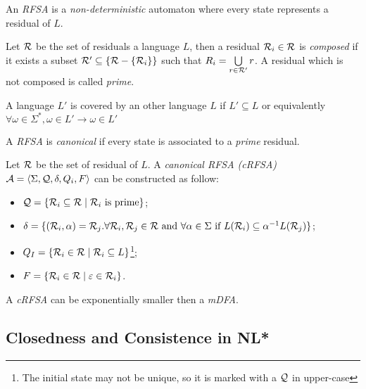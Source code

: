 \begin{definition}
  An \textit{RFSA} is a \textit{non-deterministic} automaton where every state represents a residual of $L$.
\end{definition}

\begin{definition}
  Let $\mathcal{R}$ be the set of residuals a language $L$, then a residual $\mathcal{R}_i \in \mathcal{R}$ is \textit{composed} if it exists a subset $\mathcal{R}' \subseteq \{\mathcal{R} - \{\mathcal{R}_i\}\}$ such that $R_i = \bigcup\limits_{r \in \mathcal{R}'}r$. A residual which is not composed is called \textit{prime}.
\end{definition}

\begin{definition}
  A language $L'$ is covered by an other language $L$ if $L' \subseteq L$ or equivalently $\forall \omega \in \Sigma^*, \omega \in L' \rightarrow \omega \in L'$
\end{definition}

\begin{definition}
  A \textit{RFSA} is \textit{canonical} if every state is associated to a \textit{prime} residual.
\end{definition}

Let $\mathcal{R}$ be the set of residual of $L$. A \textit{canonical RFSA (cRFSA)} $\mathcal{A} = \langle \Sigma, \mathcal{Q}, \delta, Q_i, F \rangle$ can be constructed as follow:
\begin{itemize}
  \item $\mathcal{Q} = \{\mathcal{R}_i \subseteq  \mathcal{R} \mid \mathcal{R}_i \text{ is prime}\}$;
  \item $\delta = \{(\mathcal{R}_i, \alpha) = \mathcal{R}_j. \forall \mathcal{R}_i, \mathcal{R}_j \in \mathcal{R} \text{ and } \forall \alpha \in \Sigma \text{ if } L(\mathcal{R}_i) \subseteq \alpha^{-1}L(\mathcal{R}_j)\}$;
  \item $Q_I = \{\mathcal{R}_i \in \mathcal{R} \mid \mathcal{R}_i \subseteq L\}$\footnote{The initial state may not be unique, so it is marked with a $\mathcal{Q}$ in upper-case};
  \item $F = \{\mathcal{R}_i \in \mathcal{R} \mid \varepsilon \in \mathcal{R}_i\}$.
\end{itemize}

\begin{theorem}
  A \textit{cRFSA} can be exponentially smaller then a \textit{mDFA}.
\end{theorem}

\subsection{Closedness and Consistence in NL*}

